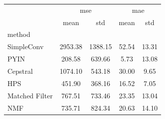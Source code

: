 \begin{tabular}{lcccc}
\toprule
 & \multicolumn{2}{c}{mse} & \multicolumn{2}{c}{mae} \\
 & mean & std & mean & std \\
method &  &  &  &  \\
\midrule
SimpleConv & 2953.38 & 1388.15 & 52.54 & 13.31 \\
PYIN & 208.58 & 639.66 & 5.73 & 13.08 \\
Cepstral & 1074.10 & 543.18 & 30.00 & 9.65 \\
HPS & 451.90 & 368.16 & 16.52 & 7.05 \\
Matched Filter & 767.51 & 733.46 & 23.35 & 13.04 \\
NMF & 735.71 & 824.34 & 20.63 & 14.10 \\
\bottomrule
\end{tabular}
